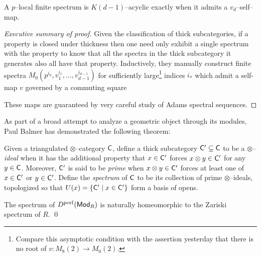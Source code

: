 \begin{theorem}
A $p$--local finite spectrum is $K(d-1)$--acyclic exactly when it admits a $v_d$--self--map.
\end{theorem}
\begin{proof}[Executive summary of proof]
Given the classification of thick subcategories, if a property is closed under thickness then one need only exhibit a single spectrum with the property to know that all the spectra in the thick subcategory it generates also all have that property.  Inductively, they manually construct finite spectra $M_0(p^{i_0}, v_1^{i_1}, \ldots, v_{d-1}^{i_{d-1}})$ for sufficiently large\footnote{Compare this asymptotic condition with the assertion yesterday that there is no root of $v: M_8(2) \to M_0(2)$.} indices $i_*$ which admit a self-map $v$ governed by a commuting square
\begin{center}
\end{center}
These maps are guaranteed by very careful study of Adams spectral sequences.
\end{proof}

As part of a broad attempt to analyze a geometric object through its modules, Paul Balmer has demonstrated the following theorem:

\begin{definition}
Given a triangulated $\otimes$--category $\mathsf{C}$, define a thick subcategory $\mathsf{C}' \subseteq \mathsf{C}$ to be a \textit{$\otimes$--ideal} when it has the additional property that $x \in \mathsf{C}'$ forces $x \otimes y \in \mathsf{C}'$ for any $y \in \mathsf{C}$.  Moreover, $\mathsf{C}'$ is said to be \textit{prime} when $x \otimes y \in \mathsf{C}'$ forces at least one of $x \in \mathsf{C}'$ or $y \in \mathsf{C}'$.  Define the \textit{spectrum} of $\mathsf{C}$ to be its collection of prime $\otimes$--ideals, topologized so that $U(x) = \{\mathsf{C}' \mid x \in \mathsf{C}'\}$ form a basis of opens.
\end{definition}

\begin{theorem}[Balmer]
The spectrum of $D^{\mathrm{perf}}(\mathsf{Mod}_R)$ is naturally homeomorphic to the Zariski spectrum of $R$. \qed
\end{theorem}

